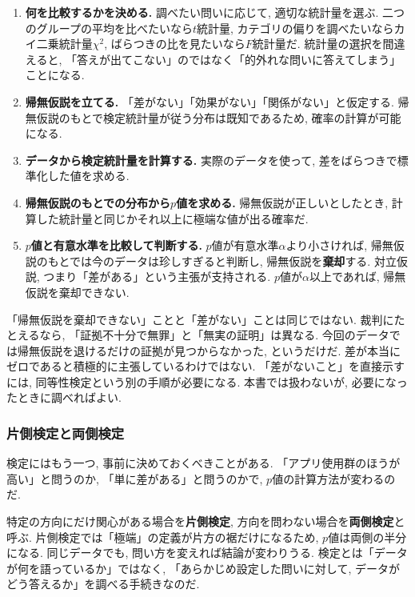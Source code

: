     \begin{enumerate}
      \item \textbf{何を比較するかを決める.}
        調べたい問いに応じて, 適切な統計量を選ぶ.
        二つのグループの平均を比べたいなら$t$統計量,
        カテゴリの偏りを調べたいならカイ二乗統計量$\chi^2$,
        ばらつきの比を見たいなら$F$統計量だ.
        統計量の選択を間違えると, 「答えが出てこない」のではなく「的外れな問いに答えてしまう」ことになる.

      \item \textbf{帰無仮説を立てる.}
        「差がない」「効果がない」「関係がない」と仮定する.
        帰無仮説のもとで検定統計量が従う分布は既知であるため, 確率の計算が可能になる.

      \item \textbf{データから検定統計量を計算する.}
        実際のデータを使って, 差をばらつきで標準化した値を求める.

      \item \textbf{帰無仮説のもとでの分布から$p$値を求める.}
        帰無仮説が正しいとしたとき, 計算した統計量と同じかそれ以上に極端な値が出る確率だ.

      \item \textbf{$p$値と有意水準を比較して判断する.}
        $p$値が有意水準$\alpha$より小さければ, 帰無仮説のもとでは今のデータは珍しすぎると判断し,
        帰無仮説を\textbf{棄却}する. 対立仮説, つまり「差がある」という主張が支持される.
        $p$値が$\alpha$以上であれば, 帰無仮説を棄却できない.
    \end{enumerate}

    「帰無仮説を棄却できない」ことと「差がない」ことは同じではない.
    裁判にたとえるなら, 「証拠不十分で無罪」と「無実の証明」は異なる.
    今回のデータでは帰無仮説を退けるだけの証拠が見つからなかった, というだけだ.
    差が本当にゼロであると積極的に主張しているわけではない.
    「差がないこと」を直接示すには, 同等性検定という別の手順が必要になる.
    本書では扱わないが, 必要になったときに調べればよい.

    \subsubsection*{片側検定と両側検定}

    検定にはもう一つ, 事前に決めておくべきことがある.
    「アプリ使用群のほうが高い」と問うのか, 「単に差がある」と問うのかで, $p$値の計算方法が変わるのだ.

    特定の方向にだけ関心がある場合を\textbf{片側検定}, 方向を問わない場合を\textbf{両側検定}と呼ぶ.
    片側検定では「極端」の定義が片方の裾だけになるため, $p$値は両側の半分になる.
    同じデータでも, 問い方を変えれば結論が変わりうる.
    検定とは「データが何を語っているか」ではなく, 「あらかじめ設定した問いに対して, データがどう答えるか」を調べる手続きなのだ.

